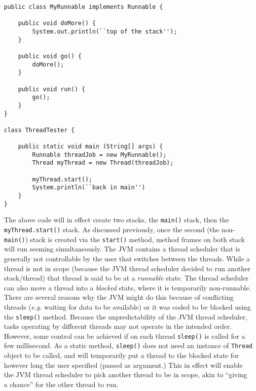 \documentclass{tufte-handout}
\begin{document}
    \begin{lstlisting}
public class MyRunnable implements Runnable {
    
    public void doMore() {
        System.out.println(``top of the stack'');
    }

    public void go() {
        doMore();
    }

    public void run() {
        go();
    }
}

class ThreadTester {
    
    public static void main (String[] args) {
        Runnable threadJob = new MyRunnable();
        Thread myThread = new Thread(threadJob);

        myThread.start();
        System.println(``back in main'')
    }
}
    \end{lstlisting}

    The above code will in effect create two stacks, the \texttt{main()} stack, then the \texttt{myThread.start()} stack. As discussed previously, once the second (the non-\texttt{main()}) stack is created via the \texttt{start()} method, method frames on both stack will run seeming simultaneously. The JVM contains a thread scheduler that is generally not controllable by the user that switches between the threads. While a thread is not in scope (because the JVM thread scheduler decided to run another stack/thread) that thread is said to be at a \emph{runnable} state. The thread scheduler can also move a thread into a \emph{blocked} state, where it is temporarily non-runnable. There are several reasons why the JVM might do this because of conflicting threads (\textit{e.g.} waiting for data to be available) or it was coded to be blocked using the \texttt{sleep()} method. Because the unpredictability of the JVM thread scheduler, tasks operating by different threads may not operate in the intended order. However, some control can be achieved if on each thread \texttt{sleep()} is called for a few millisecond. As a static method, \texttt{sleep()} does not need an instance of \texttt{Thread} object to be called, and will temporarily put a thread to the blocked state for however long the user specified (passed as argument.) This in effect will enable the JVM thread scheduler to pick another thread to be in scope, akin to ``giving a chance'' for the other thread to run. 
\end{document}
